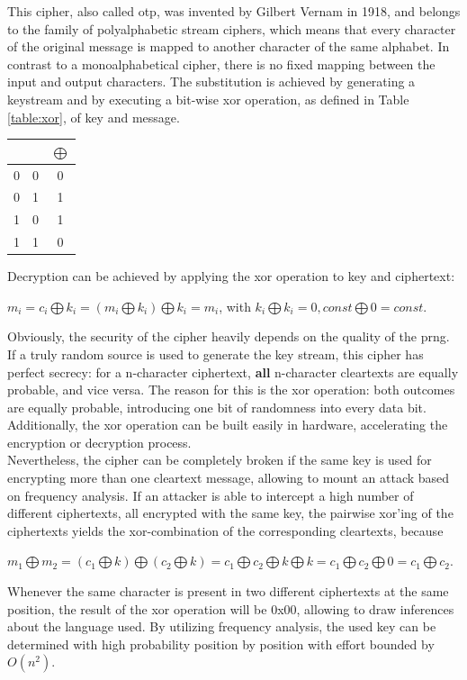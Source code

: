 This cipher, also called \gls{otp}, was invented by Gilbert Vernam in 1918, and belongs to the family of polyalphabetic stream ciphers,
which means that every character of the original message is mapped to another character of the same alphabet. In contrast to a monoalphabetical cipher,
there is no fixed mapping between the input and output characters.
The substitution is achieved by generating a keystream and by executing 
a bit-wise \gls{xor} operation, as defined in Table \ref{table:xor}, of key and message.
\begin{center}
\begin{tabular}{ c c | c }
 \label{table:xor}
   &  & $\bigoplus$ \\ \hline
  0 & 0 & 0 \\
  0 & 1 & 1 \\
  1 & 0 & 1 \\
  1 & 1 & 0 \\
\end{tabular}
\end{center}
Decryption can be achieved by applying the \gls{xor} operation to key and ciphertext:
\begin{center}
 $m_i = c_i \bigoplus k_i = (m_i \bigoplus k_i) \bigoplus k_i = m_i$, with $ k_i \bigoplus k_i = 0, const \bigoplus 0 = const$.
\end{center}
Obviously, the security of the cipher heavily depends on the quality of the \gls{prng}. If a truly random source is used to generate the key stream, this cipher
has perfect secrecy: for a n-character ciphertext, \textbf{all} n-character cleartexts are equally probable, and vice versa. 
The reason for this is the \gls{xor} operation: both outcomes are equally probable, introducing one bit of randomness into every data bit. 
\\
Additionally, the \gls{xor} operation can be built easily in hardware, accelerating the encryption or decryption process.
\\
Nevertheless, the cipher can be completely broken if the same key is used for encrypting more than one cleartext message, allowing to mount
an attack based on frequency analysis.
If an attacker is able to intercept a high number of different ciphertexts, all encrypted with the same key, the pairwise xor'ing of the ciphertexts
yields the xor-combination of the corresponding cleartexts, because
\begin{center}
 $m_1 \bigoplus m_2 = (c_1 \bigoplus k) \bigoplus (c_2 \bigoplus k) = c_1 \bigoplus c_2 \bigoplus k \bigoplus k = c_1 \bigoplus c_2 \bigoplus 0 = c_1 \bigoplus c_2$.
\end{center}
Whenever the same character is present in two different ciphertexts at the same position, the result of the \gls{xor} operation will be 0x00, allowing to draw
inferences about the language used. By utilizing frequency analysis, the used key can be determined with high probability position by position with effort bounded by $O(n^2)$.

